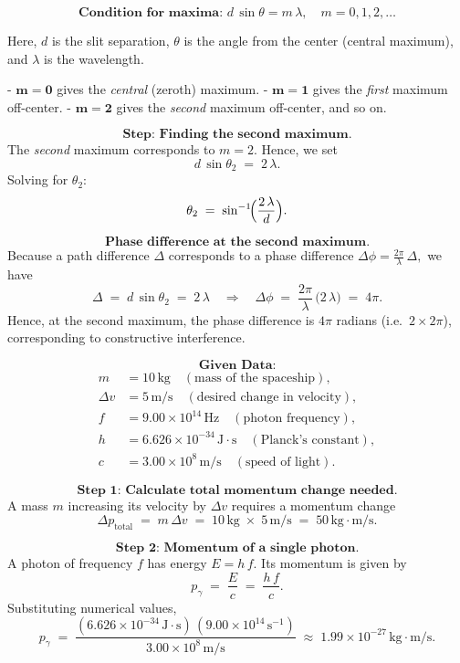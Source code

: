 \documentclass[12pt]{article}
\theoremstyle{definition} %
\theoremstyle{plain} %
\begin{document}
\[
\textbf{Condition for maxima: } 
d \,\sin\theta = m\,\lambda,
\quad m = 0,1,2,\ldots
\]

Here, \(d\) is the slit separation, \(\theta\) is the angle from the center (central maximum), and \(\lambda\) is the wavelength.

- \(\mathbf{m=0}\) gives the \textit{central} (zeroth) maximum.
- \(\mathbf{m=1}\) gives the \textit{first} maximum off-center.
- \(\mathbf{m=2}\) gives the \textit{second} maximum off-center, and so on.

\[
\textbf{Step: Finding the second maximum.}
\]
The \emph{second} maximum corresponds to \(m = 2\). Hence, we set
\[
d\,\sin \theta_2 
\;=\;
2\,\lambda.
\]
Solving for \(\theta_2\):
\[
\theta_2 
\;=\; 
\sin^{-1}\!\Bigl(\frac{2\,\lambda}{d}\Bigr).
\]

\[
\textbf{Phase difference at the second maximum.}
\]
Because a path difference \(\Delta\) corresponds to a phase difference 
\(\Delta\phi = \tfrac{2\pi}{\lambda}\,\Delta,\)
we have 
\[
\Delta 
\;=\; 
d \,\sin \theta_2
\;=\;
2\,\lambda 
\quad\Longrightarrow\quad
\Delta\phi 
\;=\;
\frac{2\pi}{\lambda}\,\bigl(2\,\lambda\bigr)
\;=\;
4\pi.
\]
Hence, at the second maximum, the phase difference is \(4\pi\) radians (i.e.\ \(2 \times 2\pi\)), corresponding to constructive interference.

\[
\textbf{Given Data:}
\]
\begin{align}
m &= 10\,\text{kg} \quad(\text{mass of the spaceship}),\\
\Delta v &= 5\,\text{m/s} \quad(\text{desired change in velocity}),\\
f &= 9.00\times 10^{14}\,\text{Hz} \quad(\text{photon frequency}),\\
h &= 6.626\times 10^{-34}\,\text{J}\cdot\text{s} \quad(\text{Planck's constant}),\\
c &= 3.00\times 10^{8}\,\text{m/s} \quad(\text{speed of light}).
\end{align}

\[
\textbf{Step 1: Calculate total momentum change needed.}
\]
A mass \(m\) increasing its velocity by \(\Delta v\) requires a momentum change
\[
\Delta p_\text{total}
\;=\;
m \,\Delta v
\;=\;
10\,\text{kg} \;\times\; 5\,\text{m/s}
\;=\;
50\,\text{kg}\cdot\text{m/s}.
\]

\[
\textbf{Step 2: Momentum of a single photon.}
\]
A photon of frequency \(f\) has energy \(E = h\,f\). Its momentum is given by
\[
p_\gamma
\;=\;
\frac{E}{c}
\;=\;
\frac{h\,f}{c}.
\]
Substituting numerical values,
\[
p_\gamma
\;=\;
\frac{(6.626\times 10^{-34}\,\text{J}\cdot\text{s})
       \,(9.00\times 10^{14}\,\text{s}^{-1})}
      {3.00\times 10^{8}\,\text{m/s}}
\;\approx\;
1.99\times 10^{-27}\,\text{kg}\cdot\text{m/s}.
\]
\end{document}

